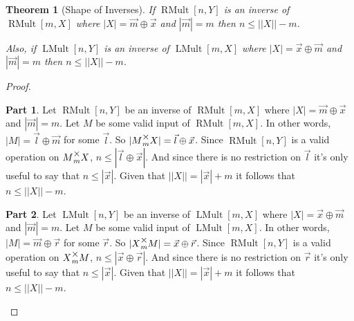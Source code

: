 \documentclass[12pt]{book}
\theoremstyle{plain}
\newtheorem{theorem}{Theorem}[chapter]
\theoremstyle{definition}
\theoremstyle{ppart}
\newtheorem{ppart}{Part}
\theoremstyle{case}
\theoremstyle{solution}
\DeclareMathOperator{\RMult}{RMult}
\DeclareMathOperator{\LMult}{LMult}
\newcommand{\mmult}[1]{\text{\raisebox{1ex}{$\underset{#1}{\times}$}}}
\begin{document}
\begin{theorem}[Shape of Inverses]
If $\RMult[n,Y]$ is an inverse of $\RMult[m,X]$ where $|X| = \vec{m} \oplus \vec{x}$ and
$|\vec{m}| = m$ then $n \le ||X||-m$.

Also, if $\LMult[n,Y]$ is an inverse of $\LMult[m,X]$ where $|X| = \vec{x} \oplus \vec{m}$ and
$|\vec{m}| = m$ then $n \le ||X||-m$.
\end{theorem}
\begin{proof}
\begin{ppart}
Let $\RMult[n,Y]$ be an inverse of $\RMult[m,X]$ where $|X| = \vec{m} \oplus \vec{x}$ and
$|\vec{m}| = m$.
Let $M$ be some valid input of $\RMult[m,X]$.
In other words, $|M| = \vec{l} \oplus \vec{m}$ for some $\vec{l}$.
So $|M \mmult{m} X| = \vec{l} \oplus \vec{x}$.
Since $\RMult[n,Y]$ is a valid operation on $M \mmult{m} X$, $n \le |\vec{l} \oplus \vec{x}|$.
And since there is no restriction on $\vec{l}$ it's only useful to say that $n \le |\vec{x}|$.
Given that $||X|| = |\vec{x}| + m$ it follows that $n \le ||X|| - m$.
\end{ppart}
\begin{ppart}
Let $\LMult[n,Y]$ be an inverse of $\LMult[m,X]$ where $|X| = \vec{x} \oplus \vec{m}$ and
$|\vec{m}| = m$.
Let $M$ be some valid input of $\LMult[m,X]$.
In other words, $|M| = \vec{m} \oplus \vec{r}$ for some $\vec{r}$.
So $|X \mmult{m} M| = \vec{x} \oplus \vec{r}$.
Since $\RMult[n,Y]$ is a valid operation on $X \mmult{m} M$, $n \le |\vec{x} \oplus \vec{r}|$.
And since there is no restriction on $\vec{r}$ it's only useful to say that $n \le |\vec{x}|$.
Given that $||X|| = |\vec{x}| + m$ it follows that $n \le ||X|| - m$.
\end{ppart}
\end{proof}
\end{document}
